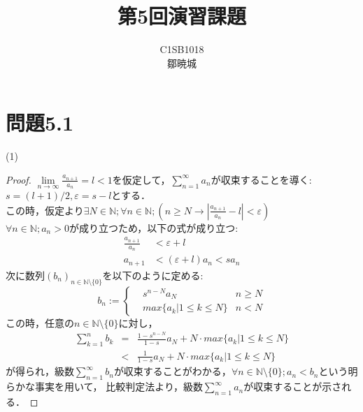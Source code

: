 \documentclass{jarticle}
\begin{document}
\title{第5回演習課題}
\author{C1SB1018 \\鄒暁城}
\maketitle

\section*{問題5.1}
\noindent
(1)
\begin{proof}
$\lim\limits_{n \to \infty} \frac{a_{n+1}}{a_n}=l<1$を仮定して，$\sum\limits_{n=1}^{\infty}a_n$が収束することを導く:\\
$s=(l+1)/2, \varepsilon =s-l$とする．\\
この時，仮定より$\exists N \in \mathbb{N}; \forall n \in \mathbb{N} ; \left( n \ge N \rightarrow \left|\frac{a_{n+1}}{a_n} -l \right| < \varepsilon \right) $\\
$\forall n \in \mathbb{N} ; a_n >0$が成り立つため，以下の式が成り立つ:\\
\begin{equation}
\begin{aligned}
\frac{a_{n+1}}{a_n} &< \varepsilon +l \\
a_{n+1} &<(\varepsilon +l) a_n < sa_n
\end{aligned}
\end{equation}
次に数列$(b_n)_{n \in \mathbb{N} \setminus \{0\}}$を以下のように定める:\\
\begin{equation}
b_n := 
		\left\{ 
		\begin{aligned}
		&s^{n-N} a_N & n \ge N\\
		&max\{a_k|1 \le k \le N \} & n<N 
		\end{aligned} \right.
\end{equation}
この時，任意の$n \in \mathbb{N} \setminus \{0\}$に対し，\\
\begin{equation}
\begin{aligned}
\sum\limits_{k=1}^{n} b_k &=& \frac{1-s^{n-N}}{1-s} a_N + N \cdot max\{a_k|1 \le k \le N \} \\
			   &<& \frac{1}{1-s} a_N + N \cdot max\{a_k|1 \le k \le N \}
\end{aligned}
\end{equation}			   
が得られ，級数$\sum\limits_{n=1}^{\infty} b_n$が収束することがわかる，$\forall n \in  \mathbb{N} \setminus \{0\} ; a_n < b_n$という明らかな事実を用いて，
比較判定法より，級数$\sum\limits_{n=1}^{\infty} a_n$が収束することが示される．
\end{proof}
\end{document}
